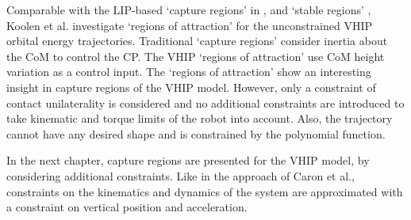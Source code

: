 Comparable with the \ac{LIP}-based `capture regions' in \cite{pratt2006capture}, \cite{koolen2012capturability} and `stable regions' \cite{stephens2007humanoid},  Koolen et al. investigate `regions of attraction' for the unconstrained \ac{VHIP} orbital energy trajectories. Traditional `capture regions' consider inertia about the \ac{CoM} to control the \ac{CP}. The \ac{VHIP} `regions of attraction' use \ac{CoM} height variation as a control input. The `regions of attraction' show an interesting insight in capture regions of the \ac{VHIP} model. However, only a constraint of contact unilaterality is considered and no additional constraints are introduced to take kinematic and torque limits of the robot into account. Also, the trajectory cannot have any desired shape and is constrained by the polynomial function.

In the next chapter, capture regions are presented for the \ac{VHIP} model, by considering additional constraints. Like in the approach of Caron et al., constraints on the kinematics and dynamics of the system are approximated with a constraint on vertical position and acceleration.